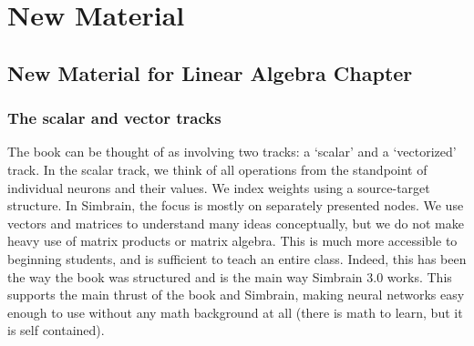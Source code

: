 \chapter{New Material}



\section{New Material for Linear Algebra Chapter}

 
\subsection{The scalar and vector tracks}



The book  can be thought of as involving two tracks: a `scalar' and a `vectorized' track. In the scalar track, we think of all operations from the standpoint of individual neurons and their values. We index weights using a source-target structure. In Simbrain, the focus is mostly on separately presented nodes. We use vectors and matrices to understand many ideas conceptually, but we do not make heavy use of matrix products or matrix algebra. This is much more accessible to beginning students, and is sufficient to teach an entire class. Indeed, this has been the way the book was structured and is the main way Simbrain 3.0 works. This supports the main thrust of the book and Simbrain, making neural networks easy enough to use without any math background at all (there is math to learn, but it is self contained). 

